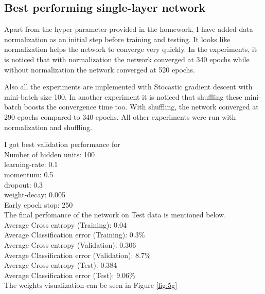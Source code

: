 \documentclass{article}
\begin{document}
\subsection{Best performing single-layer network}

Apart from the hyper parameter provided in the homework, I have added data normalization as an initial step before training and testing. It looks like normalization helps the network to converge very quickly. In the experiments, it is noticed that with normalization the network converged at 340 epochs while without normalization the network converged at 520 epochs.

Also all the experiments are implemented with Stocastic gradient descent with mini-batch size 100. In another experiment it is noticed that shuffling these mini-batch boosts the convergence time too. With shuffling, the network converged at 290 epochs compared to 340 epochs. All other experiments were run with normalization and shuffling.

I got best validation performance for \\
Number of hidden units: 100 \\ 
learning-rate: 0.1 \\ 
momentum: 0.5 \\ 
dropout: 0.3 \\ 
weight-decay: 0.005 \\
Early epoch stop: 250 \\

The final perfomance of the network on Test data is mentioned below. \\

Average Cross entropy (Training): 0.04 \\
Average Classification error (Training): 0.3\% \\

Average Cross entropy (Validation): 0.306 \\
Average Classification error (Validation): 8.7\% \\

Average Cross entropy (Test): 0.384 \\
Average Classification error (Test): 9.06\% \\

The weights visualization can be seen in Figure \ref{fig:5g}
\end{document}
